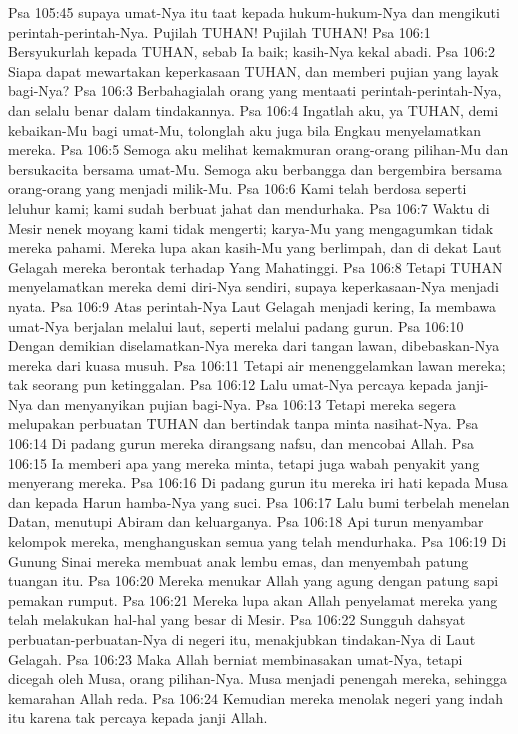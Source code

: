 Psa 105:45  supaya umat-Nya itu taat kepada hukum-hukum-Nya dan mengikuti perintah-perintah-Nya. Pujilah TUHAN! Pujilah TUHAN!
Psa 106:1  Bersyukurlah kepada TUHAN, sebab Ia baik; kasih-Nya kekal abadi.
Psa 106:2  Siapa dapat mewartakan keperkasaan TUHAN, dan memberi pujian yang layak bagi-Nya?
Psa 106:3  Berbahagialah orang yang mentaati perintah-perintah-Nya, dan selalu benar dalam tindakannya.
Psa 106:4  Ingatlah aku, ya TUHAN, demi kebaikan-Mu bagi umat-Mu, tolonglah aku juga bila Engkau menyelamatkan mereka.
Psa 106:5  Semoga aku melihat kemakmuran orang-orang pilihan-Mu dan bersukacita bersama umat-Mu. Semoga aku berbangga dan bergembira bersama orang-orang yang menjadi milik-Mu.
Psa 106:6  Kami telah berdosa seperti leluhur kami; kami sudah berbuat jahat dan mendurhaka.
Psa 106:7  Waktu di Mesir nenek moyang kami tidak mengerti; karya-Mu yang mengagumkan tidak mereka pahami. Mereka lupa akan kasih-Mu yang berlimpah, dan di dekat Laut Gelagah mereka berontak terhadap Yang Mahatinggi.
Psa 106:8  Tetapi TUHAN menyelamatkan mereka demi diri-Nya sendiri, supaya keperkasaan-Nya menjadi nyata.
Psa 106:9  Atas perintah-Nya Laut Gelagah menjadi kering, Ia membawa umat-Nya berjalan melalui laut, seperti melalui padang gurun.
Psa 106:10  Dengan demikian diselamatkan-Nya mereka dari tangan lawan, dibebaskan-Nya mereka dari kuasa musuh.
Psa 106:11  Tetapi air menenggelamkan lawan mereka; tak seorang pun ketinggalan.
Psa 106:12  Lalu umat-Nya percaya kepada janji-Nya dan menyanyikan pujian bagi-Nya.
Psa 106:13  Tetapi mereka segera melupakan perbuatan TUHAN dan bertindak tanpa minta nasihat-Nya.
Psa 106:14  Di padang gurun mereka dirangsang nafsu, dan mencobai Allah.
Psa 106:15  Ia memberi apa yang mereka minta, tetapi juga wabah penyakit yang menyerang mereka.
Psa 106:16  Di padang gurun itu mereka iri hati kepada Musa dan kepada Harun hamba-Nya yang suci.
Psa 106:17  Lalu bumi terbelah menelan Datan, menutupi Abiram dan keluarganya.
Psa 106:18  Api turun menyambar kelompok mereka, menghanguskan semua yang telah mendurhaka.
Psa 106:19  Di Gunung Sinai mereka membuat anak lembu emas, dan menyembah patung tuangan itu.
Psa 106:20  Mereka menukar Allah yang agung dengan patung sapi pemakan rumput.
Psa 106:21  Mereka lupa akan Allah penyelamat mereka yang telah melakukan hal-hal yang besar di Mesir.
Psa 106:22  Sungguh dahsyat perbuatan-perbuatan-Nya di negeri itu, menakjubkan tindakan-Nya di Laut Gelagah.
Psa 106:23  Maka Allah berniat membinasakan umat-Nya, tetapi dicegah oleh Musa, orang pilihan-Nya. Musa menjadi penengah mereka, sehingga kemarahan Allah reda.
Psa 106:24  Kemudian mereka menolak negeri yang indah itu karena tak percaya kepada janji Allah.
